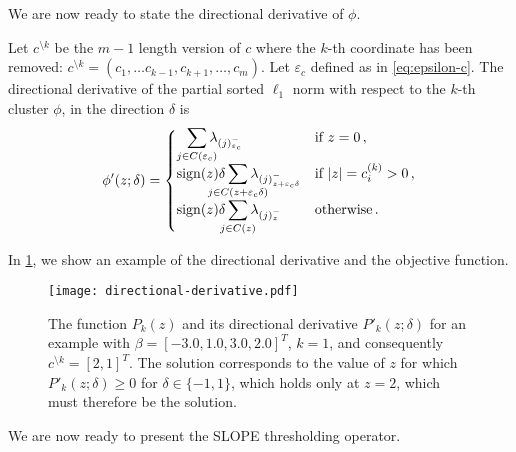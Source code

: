 We are now ready to state the directional derivative of $\phi$. %

\begin{theorem}\label{thm:sl1-directional-derivative}
  Let \(c^{\setminus k}\) be the \(m - 1\) length version of $c$ where the $k$-th coordinate has been removed: $c^{\setminus k} = (c_1, \ldots c_{k-1}, c_{k+1}, \ldots, c_m)$.
  Let \({\varepsilon_c}\) defined as in \eqref{eq:epsilon-c}.
  The directional derivative of the partial sorted $\ell_1$ norm with respect to the $k$-th cluster \(\phi\), in the direction \(\delta\) is
  \[
    \phi'(z; \delta) =
    \begin{cases}
      \smashoperator[r]{\sum_{j \in C(\varepsilon_c )}} \lambda_{(j)^-_{\varepsilon_c }}
       & \text{if } z = 0 \, ,               \\
      \sign(z)\delta\smashoperator{\sum_{j \in C(z + {\varepsilon_c} \delta)}} \lambda_{(j)^-_{z + {\varepsilon_c}\delta}}
       & \text{if } |z| = c^{(k)}_i > 0 \, , \\
      \sign(z)\delta\smashoperator{\sum_{j \in C(z)}} \lambda_{(j)^-_{z}}
       & \text{otherwise} \, .
    \end{cases}
  \]
\end{theorem}

In \cref{fig:directional-derivative}, we show an example of the directional
derivative and the objective function.

\begin{figure}[htb]
  \centering
  \texttt{[image: directional-derivative.pdf]}
  \caption{%
  The function \(P_k(z)\) and its directional derivative \(P'_k(z; \delta)\) for
  an example with \(\beta = [-3.0, 1.0, 3.0, 2.0]^T\), \(k = 1\), and consequently
  \(c^{\setminus k} = [2, 1]^T\). The solution corresponds to the value of \(z\) for
      which \(P'_k(z; \delta) \geq 0 \) for \(\delta \in \{-1, 1\}\), which holds only
      at \(z = 2\), which must therefore be the solution.
    }
  \label{fig:directional-derivative}
\end{figure}

We are now ready to present the SLOPE thresholding operator.

